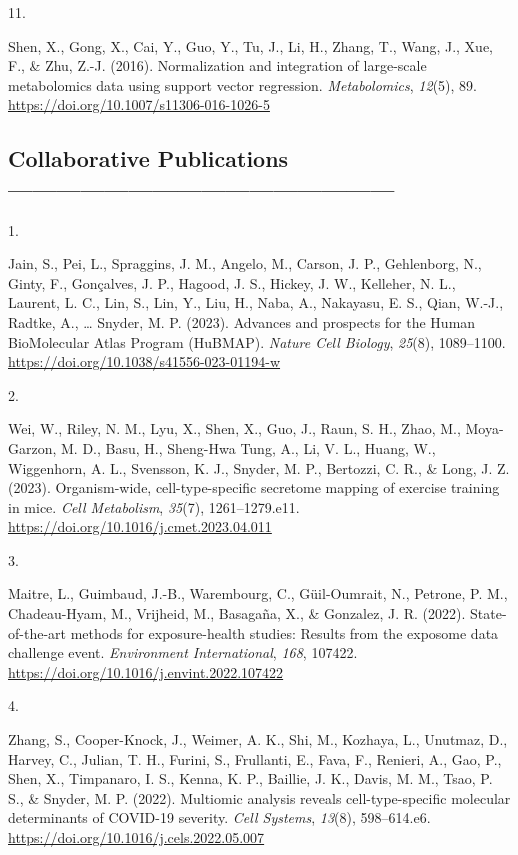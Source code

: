 \documentclass[11pt,a4paper,]{moderncv}
\newlength{\csllabelwidth}
\newcommand{\CSLLeftMargin}[1]{\parbox[t]{\csllabelwidth}{#1}}
\newcommand{\CSLRightInline}[1]{\parbox[t]{\linewidth - \csllabelwidth}{#1}}
\begin{document}
\leavevmode{}%
\CSLLeftMargin{11. }%
\CSLRightInline{Shen, X., Gong, X., Cai, Y., Guo, Y., Tu, J., Li, H.,
Zhang, T., Wang, J., Xue, F., \& Zhu, Z.-J. (2016). Normalization and
integration of large-scale metabolomics data using support vector
regression. \emph{Metabolomics}, \emph{12}(5), 89.
\url{https://doi.org/10.1007/s11306-016-1026-5}}

\hypertarget{collaborative-publications}{%
\subsection{Collaborative
Publications------------------------------------------------}\label{collaborative-publications}}

\hypertarget{bibliography}{}
\leavevmode{}%
\CSLLeftMargin{1. }%
\CSLRightInline{Jain, S., Pei, L., Spraggins, J. M., Angelo, M., Carson,
J. P., Gehlenborg, N., Ginty, F., Gonçalves, J. P., Hagood, J. S.,
Hickey, J. W., Kelleher, N. L., Laurent, L. C., Lin, S., Lin, Y., Liu,
H., Naba, A., Nakayasu, E. S., Qian, W.-J., Radtke, A., \ldots{} Snyder,
M. P. (2023). Advances and prospects for the Human BioMolecular Atlas
Program (HuBMAP). \emph{Nature Cell Biology}, \emph{25}(8), 1089--1100.
\url{https://doi.org/10.1038/s41556-023-01194-w}}

\leavevmode{}%
\CSLLeftMargin{2. }%
\CSLRightInline{Wei, W., Riley, N. M., Lyu, X., Shen, X., Guo, J., Raun,
S. H., Zhao, M., Moya-Garzon, M. D., Basu, H., Sheng-Hwa Tung, A., Li,
V. L., Huang, W., Wiggenhorn, A. L., Svensson, K. J., Snyder, M. P.,
Bertozzi, C. R., \& Long, J. Z. (2023). Organism-wide,
cell-type-specific secretome mapping of exercise training in mice.
\emph{Cell Metabolism}, \emph{35}(7), 1261--1279.e11.
\url{https://doi.org/10.1016/j.cmet.2023.04.011}}

\leavevmode{}%
\CSLLeftMargin{3. }%
\CSLRightInline{Maitre, L., Guimbaud, J.-B., Warembourg, C.,
Güil-Oumrait, N., Petrone, P. M., Chadeau-Hyam, M., Vrijheid, M.,
Basagaña, X., \& Gonzalez, J. R. (2022). State-of-the-art methods for
exposure-health studies: Results from the exposome data challenge event.
\emph{Environment International}, \emph{168}, 107422.
\url{https://doi.org/10.1016/j.envint.2022.107422}}

\leavevmode{}%
\CSLLeftMargin{4. }%
\CSLRightInline{Zhang, S., Cooper-Knock, J., Weimer, A. K., Shi, M.,
Kozhaya, L., Unutmaz, D., Harvey, C., Julian, T. H., Furini, S.,
Frullanti, E., Fava, F., Renieri, A., Gao, P., Shen, X., Timpanaro, I.
S., Kenna, K. P., Baillie, J. K., Davis, M. M., Tsao, P. S., \& Snyder,
M. P. (2022). Multiomic analysis reveals cell-type-specific molecular
determinants of COVID-19 severity. \emph{Cell Systems}, \emph{13}(8),
598--614.e6. \url{https://doi.org/10.1016/j.cels.2022.05.007}}
\end{document}
